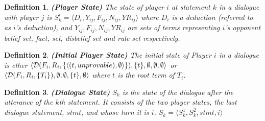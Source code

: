 \documentclass{blue-book}
\newtheorem{definition}{Definition}
\newcommand{\pt}[2]{\ensuremath{\langle #1,#2 \rangle}}
\newcommand{\node}[2]{\ensuremath{(#1, #2)}}
\newcommand{\deduction}[3]{\ensuremath{{\cal D}(#1, #2, #3)}}
\begin{document}
\begin{sloppypar}
\begin{definition}{\bf (Player State)}
The \emph{state} of player $i$ at statement $k$ in a dialogue with player $j$ is $S^i_k = \langle  D_i, Y_{ij}, F_{ij}, N_{ij}, YR_{ij} \rangle$ where $D_i$ is a deduction (referred to as $i$'s deduction), and $Y_{ij}, F_{ij}, N_{ij}, YR_{ij}$ are sets of terms representing $i$'s opponent belief set, fact, set, disbelief set and rule set respectively.
\end{definition}

\begin{definition}{\bf (Initial Player State)}
The initial state of  Player $i$ in a dialogue is ether $\langle \deduction{F_i}{R_i}{\{\pt{\node{t}{unprovable}}{\emptyset}\}}, \{t\}, \emptyset, \emptyset, \emptyset \rangle$ or  $\langle \deduction{F_i}{R_i}{\{T_i\}}, \emptyset, \emptyset, \{t\}, \emptyset \rangle$ where $t$ is the root term of $T_i$.
\end{definition}
\end{sloppypar}



\begin{definition}{\bf (Dialogue State)}
$S_{k}$ is the state of the dialogue after the utterance of the $k$th statement. It consists of the two player states, the last dialogue statement, $stmt$, and whose turn it is $i$.  $S_{k} = \langle S^1_{k}, S^2_{k}, stmt, i \rangle$
\end{definition}
\end{document}
